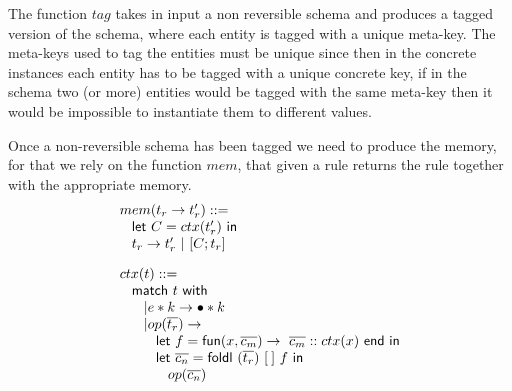 \documentclass{article}[12pt,a4paper]
\theoremstyle{definition}
\begin{document}
The function $tag$ takes in input a non reversible schema and produces a
tagged version of the schema, where each entity is tagged with a unique meta-key. The meta-keys used to tag the
entities must be unique since then in the concrete instances each entity has to
be tagged with a unique concrete key, if in the schema two (or more) entities
would be tagged with the same meta-key then it would be impossible to
instantiate them to different values.

Once a non-reversible schema has been tagged we need to produce the memory, for
that we rely on the function $mem$, that given a rule returns the rule together
with the appropriate memory.
\[
  \begin{array}{l}
  \begin{array}{l}
    mem(t_r \rightarrow t'_r) ::=\\
    \hspace{2ex}\mathsf{let}~C=ctx(t'_r)~\mathsf{in}\\
    \hspace{2ex}t_r \rightarrow t'_r~|~[C;t_r]
  \end{array}\\[5ex]
  
  \begin{array}{l}
    ctx(t)::=\\
    \hspace{2ex}\mathsf{match}~t~\mathsf{with}\\
    \hspace{4ex}| e*k \rightarrow \bullet * k\\
    \hspace{4ex}| op(\overline{t_r}) \rightarrow \\
    \hspace{6ex} \mathsf{let}~f=\mathsf{fun}(x,\overline{c_m})\rightarrow~\overline{c_m}::ctx(x)~\mathsf{end}~\mathsf{in}\\
    \hspace{6ex}\mathsf{let}~\overline{c_n} =
    \mathsf{foldl}~(\overline{t_r})~[\:]~f~\mathsf{in}\\
    \hspace{8ex} op(\overline{c_n})
  \end{array}
  \end{array}
\]
\end{document}
